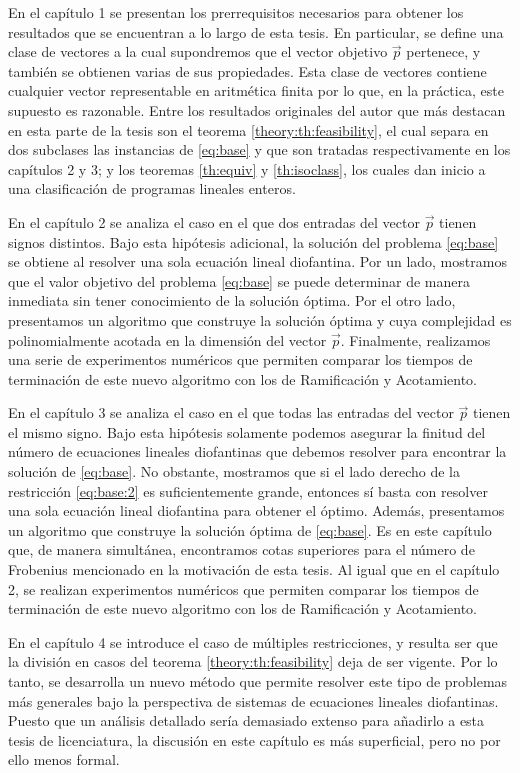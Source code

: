 En el capítulo 1 se presentan los prerrequisitos necesarios para obtener los resultados que se
encuentran a lo largo de esta tesis. En particular, se define una clase de vectores a la cual
supondremos que el vector objetivo $\vec{p}$ pertenece, y también se obtienen varias de sus
propiedades. Esta clase de vectores contiene cualquier vector representable en aritmética finita por
lo que, en la práctica, este supuesto es razonable. Entre los resultados originales del autor que
más destacan en esta parte de la tesis son el teorema \ref{theory:th:feasibility}, el cual separa en
dos subclases las instancias de \eqref{eq:base} y que son tratadas respectivamente en los capítulos
2 y 3; y los teoremas \ref{th:equiv} y \ref{th:isoclass}, los cuales dan inicio a una clasificación
de programas lineales enteros.

En el capítulo 2 se analiza el caso en el que dos entradas del vector $\vec{p}$ tienen signos
distintos. Bajo esta hipótesis adicional, la solución del problema \eqref{eq:base} se obtiene al
resolver una sola ecuación lineal diofantina. Por un lado, mostramos que el valor objetivo del
problema \eqref{eq:base} se puede determinar de manera inmediata sin tener conocimiento de la
solución óptima. Por el otro lado, presentamos un algoritmo que construye la solución óptima y cuya
complejidad es polinomialmente acotada en la dimensión del vector $\vec{p}$. Finalmente, realizamos
una serie de experimentos numéricos que permiten comparar los tiempos de terminación de este nuevo
algoritmo con los de Ramificación y Acotamiento.

En el capítulo 3 se analiza el caso en el que todas las entradas del vector $\vec{p}$ tienen el mismo
signo. Bajo esta hipótesis solamente podemos asegurar la finitud del número de ecuaciones lineales
diofantinas que debemos resolver para encontrar la solución de \eqref{eq:base}. No obstante,
mostramos que si el lado derecho de la restricción \eqref{eq:base:2} es suficientemente grande,
entonces sí basta con resolver una sola ecuación lineal diofantina para obtener el óptimo. Además,
presentamos un algoritmo que construye la solución óptima de \eqref{eq:base}. Es en este capítulo
que, de manera simultánea, encontramos cotas superiores para el número de Frobenius mencionado en la
motivación de esta tesis. Al igual que en el capítulo 2, se realizan experimentos numéricos
que permiten comparar los tiempos de terminación de este nuevo algoritmo con los de Ramificación y
Acotamiento.

En el capítulo 4 se introduce el caso de múltiples restricciones, y resulta ser que la división en
casos del teorema \ref{theory:th:feasibility} deja de ser vigente. Por lo tanto, se desarrolla un
nuevo método que permite resolver este tipo de problemas más generales bajo la perspectiva de
sistemas de ecuaciones lineales diofantinas. Puesto que un análisis detallado sería demasiado
extenso para añadirlo a esta tesis de licenciatura, la discusión en este capítulo es más
superficial, pero no por ello menos formal.

